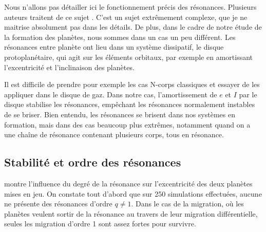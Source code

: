 Nous n'allons pas détailler ici le fonctionnement précis des résonances. Plusieurs auteurs traitent de ce sujet \citep{greenberg1977orbit, peale1986orbital, malhotra1988phd}. C'est un sujet extrêmement complexe, que je ne maitrise absolument pas dans les détails. De plus, dans le cadre de notre étude de la formation des planètes, nous sommes dans un cas un peu différent. Les résonances entre planète ont lieu dans un système dissipatif, le disque protoplanétaire, qui agit sur les éléments orbitaux, par exemple en amortissant l'excentricité et l'inclinaison des planètes.

Il est difficile de prendre pour exemple les cas N-corps classiques et essayer de les appliquer dans le disque de gaz. Dans notre cas, l'amortissement de $e$ et $I$ par le disque stabilise les résonances, empêchant les résonances normalement instables de se briser. Bien entendu, les résonances se brisent dans nos systèmes en formation, mais dans des cas beaucoup plus extrêmes, notamment quand on a une chaîne de résonance contenant plusieurs corps, tous en résonance. 

\subsection{Stabilité et ordre des résonances}
 montre l'influence du degré de la résonance sur l'excentricité des deux planètes mises en jeu. On
constate tout d'abord que sur 250 simulations effectuées, aucune ne présente des résonances d'ordre $q\neq 1$. Dans le cas de la
migration, où les planètes veulent sortir de la résonance au travers de leur migration différentielle, seules les migration
d'ordre 1 sont assez fortes pour survivre. 


